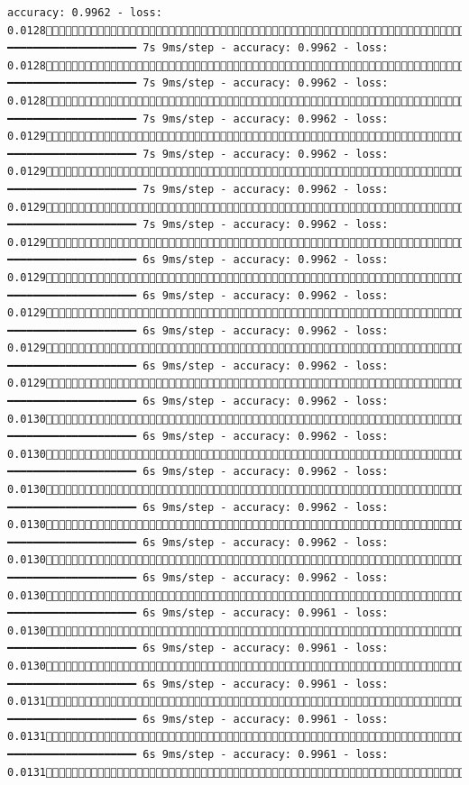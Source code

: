 \documentclass[
  letterpaper,
  DIV=11,
  numbers=noendperiod]{scrreprt}
\begin{document}
\begin{verbatim}
accuracy: 0.9962 - loss: 0.01281064/1875 ━━━━━━━━━━━━━━━━━━━━ 7s 9ms/step - accuracy: 0.9962 - loss: 0.01281070/1875 ━━━━━━━━━━━━━━━━━━━━ 7s 9ms/step - accuracy: 0.9962 - loss: 0.01281076/1875 ━━━━━━━━━━━━━━━━━━━━ 7s 9ms/step - accuracy: 0.9962 - loss: 0.01291078/1875 ━━━━━━━━━━━━━━━━━━━━ 7s 9ms/step - accuracy: 0.9962 - loss: 0.01291082/1875 ━━━━━━━━━━━━━━━━━━━━ 7s 9ms/step - accuracy: 0.9962 - loss: 0.01291087/1875 ━━━━━━━━━━━━━━━━━━━━ 7s 9ms/step - accuracy: 0.9962 - loss: 0.01291095/1875 ━━━━━━━━━━━━━━━━━━━━ 6s 9ms/step - accuracy: 0.9962 - loss: 0.01291101/1875 ━━━━━━━━━━━━━━━━━━━━ 6s 9ms/step - accuracy: 0.9962 - loss: 0.01291108/1875 ━━━━━━━━━━━━━━━━━━━━ 6s 9ms/step - accuracy: 0.9962 - loss: 0.01291114/1875 ━━━━━━━━━━━━━━━━━━━━ 6s 9ms/step - accuracy: 0.9962 - loss: 0.01291120/1875 ━━━━━━━━━━━━━━━━━━━━ 6s 9ms/step - accuracy: 0.9962 - loss: 0.01301126/1875 ━━━━━━━━━━━━━━━━━━━━ 6s 9ms/step - accuracy: 0.9962 - loss: 0.01301131/1875 ━━━━━━━━━━━━━━━━━━━━ 6s 9ms/step - accuracy: 0.9962 - loss: 0.01301137/1875 ━━━━━━━━━━━━━━━━━━━━ 6s 9ms/step - accuracy: 0.9962 - loss: 0.01301142/1875 ━━━━━━━━━━━━━━━━━━━━ 6s 9ms/step - accuracy: 0.9962 - loss: 0.01301148/1875 ━━━━━━━━━━━━━━━━━━━━ 6s 9ms/step - accuracy: 0.9962 - loss: 0.01301153/1875 ━━━━━━━━━━━━━━━━━━━━ 6s 9ms/step - accuracy: 0.9961 - loss: 0.01301159/1875 ━━━━━━━━━━━━━━━━━━━━ 6s 9ms/step - accuracy: 0.9961 - loss: 0.01301165/1875 ━━━━━━━━━━━━━━━━━━━━ 6s 9ms/step - accuracy: 0.9961 - loss: 0.01311171/1875 ━━━━━━━━━━━━━━━━━━━━ 6s 9ms/step - accuracy: 0.9961 - loss: 0.01311177/1875 ━━━━━━━━━━━━━━━━━━━━ 6s 9ms/step - accuracy: 0.9961 - loss: 0.01311183/1875 
\end{verbatim}
\end{document}
